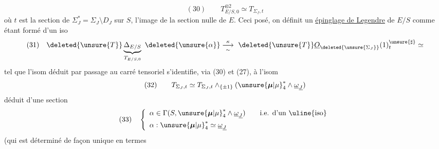 \[
(30)\qquad T_{E/S,0}^{\otimes2}\simeq T_{\Sigma_{\underline{J}},t}
\]
où $t$ est la section de $\Sigma_J^*=\Sigma_J\setminus D_J$ sur $S$, l'image de la section nulle de $E$. Ceci posé, on définit un \uline{épinglage de Legendre} de $E/S$ comme étant formé d'un iso
\[
(31)\quad\deleted{\unsure{T}}\underbrace{\Delta_{E/S}}_{T_{E/S,0}}\ \deleted{\unsure{\alpha}}\overset{\kappa}{\underset{\sim}{\longrightarrow}}\ \deleted{\unsure{T}}\underline{O}_{\deleted{\unsure{\Sigma_J}}}(1)_{t}^{\unsure{\sharp}}\simeq
\]
tel que  l'isom déduit par passage au carré tensoriel s'identifie, via (30) et (27), à l'isom
\[
(32)\qquad T_{\Sigma_J,t}\simeq T_{\Sigma_J,t}\wedge_{\{\pm1\}}(\unsure{\boldsymbol{\mu}|\mu}_4^*\wedge\underline{\omega}_{\underline{J}})
\]
déduit d'une section
\[
(33)\quad\left\{\begin{array}{l}
\alpha\in\Gamma(S,\unsure{\boldsymbol{\mu}|\mu}_4^*\wedge\underline{\omega}_{\underline{J}})\qquad\text{i.e. d'un \uline{iso}}\\[5pt]
\alpha:\unsure{\boldsymbol{\mu}|\mu}_4^*\simeq\underline{\omega}_{\underline{J}}
\end{array}\right.
\]
(qui est déterminé de façon unique en termes
